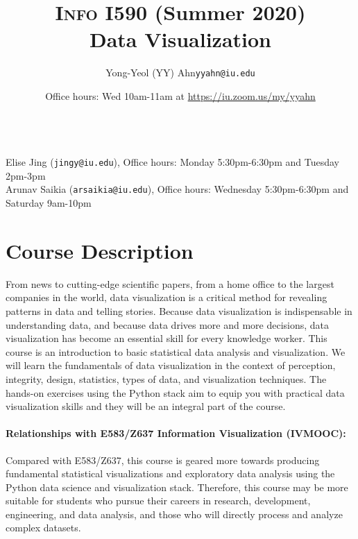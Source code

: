 \documentclass[11pt,article,oneside]{memoir} %
\makeatletter
\def\myauthor{Author}
\def\mytitle{Title}
\def\myaddress{\url{https://iu.zoom.us/my/yyahn}}
\def\myemail{yyahn@iu.edu}
\def\myauthor{Yong-Yeol (YY) Ahn}
\def\mytitle{{\normalsize \textsc{Info} I590 (Summer 2020)} \\ \HUGE{} Data Visualization}
\makeatother
\begin{document}

\title{\LARGE \mytitle} %
\author{\Large\myauthor\newline \footnotesize\texttt{\noindent\myemail}}
\date{Office hours: Wed 10am-11am at \myaddress}


\maketitle 

\vspace{-20pt}{\bfseries Assistant Instructor} \\ %
Elise Jing (\texttt{jingy@iu.edu}), Office hours: Monday 5:30pm-6:30pm and Tuesday 2pm-3pm\\
Arunav Saikia (\texttt{arsaikia@iu.edu}), Office hours: Wednesday 5:30pm-6:30pm and Saturday 9am-10pm


\section{Course Description}%

From news to cutting-edge scientific papers, from a home office to the largest companies in the world, data visualization is a critical method for revealing patterns in data and telling stories. 
Because data visualization is indispensable in understanding data, and because data drives more and more decisions, data visualization has become an essential skill for every knowledge worker.  
This course is an introduction to basic statistical data analysis and visualization.  
We will learn the fundamentals of data visualization in the context of perception, integrity, design, statistics, types of data, and visualization techniques.  
The hands-on exercises using the Python stack aim to equip you with practical data visualization skills and they will be an integral part of the course. 

\paragraph{Relationships with E583/Z637 Information Visualization (IVMOOC):}
Compared with E583/Z637, this course is geared more towards producing fundamental statistical visualizations and exploratory data analysis using the Python data science and visualization stack.  
Therefore, this course may be more suitable for students who pursue their careers in research, development, engineering, and data analysis, and those who will directly process and analyze complex datasets. 
\end{document}
